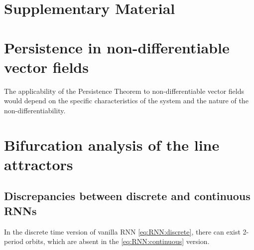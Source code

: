 \documentclass{article} %
\newcounter{ct}
\theoremstyle{definition}
\theoremstyle{remark}
\begin{document}

\small

\newpage


%




\newpage
\section*{Supplementary Material}
\setcounter{section}{0}

%


\section{Persistence in non-differentiable vector fields}
The applicability of the Persistence Theorem to non-differentiable vector fields would depend on the specific characteristics of the system and the nature of the non-differentiability.
%

\section{Bifurcation analysis of the line attractors}

\subsection{Discrepancies between discrete and continuous RNNs}
\label{sec:discrepancies}
In the discrete time version of vanilla RNN \eqref{eq:RNN:discrete}, there can exist 2-period orbits, which are absent in the \eqref{eq:RNN:continuous} version.
\end{document}
